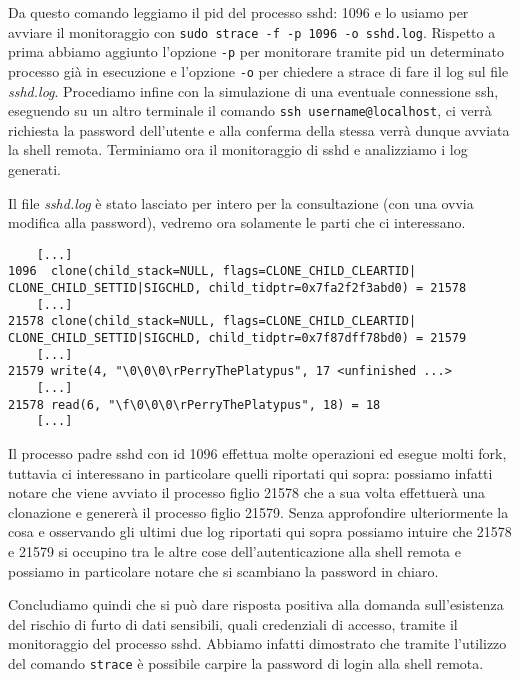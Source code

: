 \documentclass{article}
\newcommand{\filename}[1]{\textit{#1}}
\newcommand{\command}[1]{\texttt{#1}}
\begin{document}
Da questo comando leggiamo il pid del processo sshd: 1096 e lo usiamo per avviare il monitoraggio con \command{sudo strace -f -p 1096 -o sshd.log}. Rispetto a prima abbiamo aggiunto l'opzione \command{-p} per monitorare tramite pid un determinato processo già in esecuzione e l'opzione \command{-o} per chiedere a strace di fare il log sul file \filename{sshd.log}. Procediamo infine con la simulazione di una eventuale connessione ssh, eseguendo su un altro terminale il comando \command{ssh username@localhost}, ci verrà richiesta la password dell'utente e alla conferma della stessa verrà dunque avviata la shell remota. Terminiamo ora il monitoraggio di sshd e analizziamo i log generati.

Il file \filename{sshd.log} è stato lasciato per intero per la consultazione (con una ovvia modifica alla password), vedremo ora solamente le parti che ci interessano.

\begin{verbatim}
    [...]
1096  clone(child_stack=NULL, flags=CLONE_CHILD_CLEARTID|
CLONE_CHILD_SETTID|SIGCHLD, child_tidptr=0x7fa2f2f3abd0) = 21578
    [...]
21578 clone(child_stack=NULL, flags=CLONE_CHILD_CLEARTID|
CLONE_CHILD_SETTID|SIGCHLD, child_tidptr=0x7f87dff78bd0) = 21579
    [...]
21579 write(4, "\0\0\0\rPerryThePlatypus", 17 <unfinished ...>
    [...]
21578 read(6, "\f\0\0\0\rPerryThePlatypus", 18) = 18
    [...]
\end{verbatim}

Il processo padre sshd con id 1096 effettua molte operazioni ed esegue molti fork, tuttavia ci interessano in particolare quelli riportati qui sopra: possiamo infatti notare che viene avviato il processo figlio 21578 che a sua volta effettuerà una clonazione e genererà il processo figlio 21579. Senza approfondire ulteriormente la cosa e osservando gli ultimi due log riportati qui sopra possiamo intuire che 21578 e 21579 si occupino tra le altre cose dell'autenticazione alla shell remota e possiamo in particolare notare che si scambiano la password in chiaro.

Concludiamo quindi che si può dare risposta positiva alla domanda sull'esistenza del rischio di furto di dati sensibili, quali credenziali di accesso, tramite il monitoraggio del processo sshd. Abbiamo infatti dimostrato che tramite l'utilizzo del comando \command{strace} è possibile carpire la password di login alla shell remota.

\end{document}
